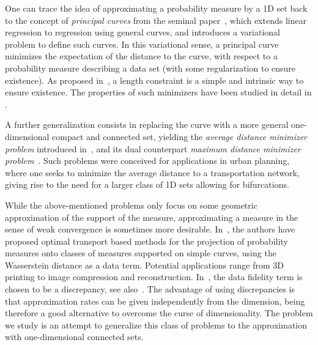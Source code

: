 \documentclass[10pt]{amsart}
\theoremstyle{definition}
\begin{document}
One can trace the idea of approximating a probability measure by a 1D set back to the concept of \textit{principal curves} from the seminal paper~\cite{hastie1989principal}, which extends linear regression to regression using general curves, and introduces a variational problem to define such curves.
In this variational sense, a principal curve minimizes the expectation of the distance to the curve, with respect to a probability measure describing a data set (with some regularization to ensure existence). As proposed in~\cite{kegl2000learning}, a length constraint is a simple and intrinsic way to ensure existence. The properties of such minimizers have been studied in detail in \eg \cite{lu2016average,delattre2020principal}.

A further generalization consists in replacing the curve with a more general one-dimensional compact and connected set, yielding the \textit{average distance minimizer problem} introduced in~\cite{buttazzo2003optimal}, and its dual counterpart \textit{maximum distance minimizer problem}~\cite{paolini2004qualitative,lemenant2010presentation}. Such problems were conceived for applications in urban planning, where one seeks to minimize the average distance to a transportation network, giving rise to the need for a larger class of 1D sets allowing for bifurcations.

While the above-mentioned problems only focus on some geometric approximation of the support of the measure, approximating a measure in the sense of weak convergence is sometimes more desirable. In~\cite{lebrat2019optimal,chauffert2017projection}, the authors have proposed optimal transport based methods for the projection of probability measures onto classes of measures supported on simple curves, using the Wasserstein distance as a data term. Potential applications range from 3D printing to image compression and reconstruction.
In~\cite{ehler2021curve}, the data fidelity term is chosen to be a discrepancy, see
also~\cite{neumayer2021optimal}. The advantage of using discrepancies is that approximation rates can be given independently from the dimension, being therefore a good alternative to overcome the curse of dimensionality. The problem we study is an attempt to generalize this class of problems
to the approximation with one-dimensional connected sets.
\end{document}
